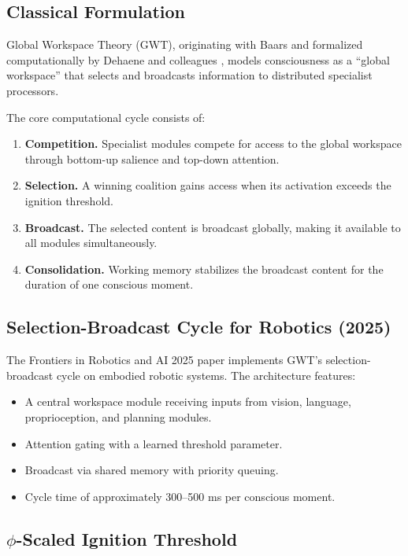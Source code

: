 \documentclass[12pt,a4paper]{article}
\begin{document}
\subsection{Classical Formulation}

Global Workspace Theory (GWT), originating with Baars \cite{Baars1988} and
formalized computationally by Dehaene and colleagues \cite{Dehaene2014},
models consciousness as a ``global workspace'' that selects and broadcasts
information to distributed specialist processors.

The core computational cycle consists of:
\begin{enumerate}[leftmargin=2em]
  \item \textbf{Competition.} Specialist modules compete for access to the
    global workspace through bottom-up salience and top-down attention.
  \item \textbf{Selection.} A winning coalition gains access when its
    activation exceeds the ignition threshold.
  \item \textbf{Broadcast.} The selected content is broadcast globally,
    making it available to all modules simultaneously.
  \item \textbf{Consolidation.} Working memory stabilizes the broadcast
    content for the duration of one conscious moment.
\end{enumerate}

\subsection{Selection-Broadcast Cycle for Robotics (2025)}

The Frontiers in Robotics and AI 2025 paper \cite{Frontiers2025GWT} implements
GWT's selection-broadcast cycle on embodied robotic systems. The architecture
features:

\begin{itemize}[leftmargin=2em]
  \item A central workspace module receiving inputs from vision, language,
    proprioception, and planning modules.
  \item Attention gating with a learned threshold parameter.
  \item Broadcast via shared memory with priority queuing.
  \item Cycle time of approximately 300--500 ms per conscious moment.
\end{itemize}

\subsection{$\phi$-Scaled Ignition Threshold}
\end{document}
